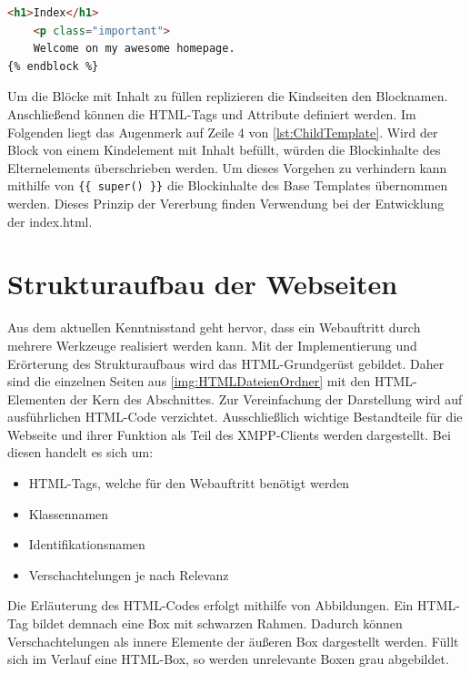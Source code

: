 \documentclass[a4paper,titlepage,halfparskip,12pt]{scrreprt}
\begin{document}
\begin{onehalfspacing}
\begin{lstlisting}[language=HTML,caption=Beispiel einer Grundseite für das Vererbungsprinzip,label={lst:ChildTemplate}]
	<h1>Index</h1>
	<p class="important">
	Welcome on my awesome homepage.
{% endblock %}
\end{lstlisting}
Um die Blöcke mit Inhalt zu füllen replizieren die Kindseiten den Blocknamen. Anschließend können die HTML-Tags und Attribute definiert werden. Im Folgenden liegt das Augenmerk auf Zeile 4 von \autoref{lst:ChildTemplate}. Wird der Block von einem Kindelement mit Inhalt befüllt, würden die Blockinhalte des Elternelements überschrieben werden. Um dieses Vorgehen zu verhindern kann mithilfe von \texttt{\{\{ super() \}\}} die Blockinhalte des Base Templates übernommen werden. Dieses Prinzip der Vererbung finden Verwendung bei der Entwicklung der index.html. \cite{FlaskTempInherDoc}

\section{Strukturaufbau der Webseiten}
\label{subsec:StrukturaufbauWebseiten}
Aus dem aktuellen Kenntnisstand geht hervor, dass ein Webauftritt durch mehrere Werkzeuge realisiert werden kann. Mit der Implementierung und Erörterung des Strukturaufbaus wird das HTML-Grundgerüst gebildet. Daher sind die einzelnen Seiten aus \autoref{img:HTMLDateienOrdner} mit den HTML-Elementen der Kern des Abschnittes. Zur Vereinfachung der Darstellung wird auf ausführlichen HTML-Code verzichtet. Ausschließlich wichtige Bestandteile für die Webseite und ihrer Funktion als Teil des XMPP-Clients werden dargestellt. Bei diesen handelt es sich um:
\begin{itemize}
	\item HTML-Tags, welche für den Webauftritt benötigt werden
	\item Klassennamen
	\item Identifikationsnamen
	\item Verschachtelungen je nach Relevanz
\end{itemize}
Die Erläuterung des HTML-Codes erfolgt mithilfe von Abbildungen. Ein HTML-Tag bildet demnach eine Box mit schwarzen Rahmen. Dadurch können Verschachtelungen als innere Elemente der äußeren Box dargestellt werden. Füllt sich im Verlauf eine HTML-Box, so werden unrelevante Boxen grau abgebildet.


\end{onehalfspacing}
\end{document}
